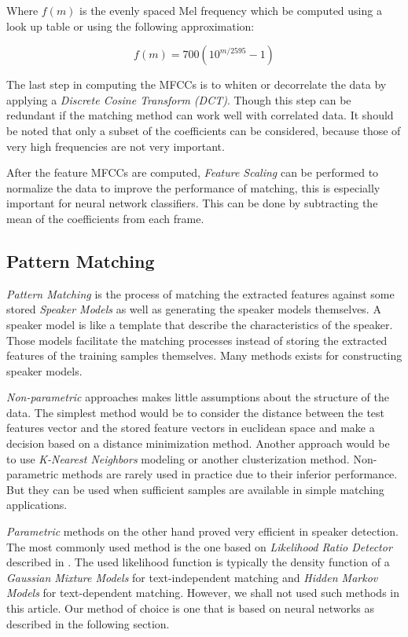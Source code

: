 \documentclass[twocolumn]{article}
\begin{document}
Where $f(m)$ is the evenly spaced Mel frequency which be computed using a look
up table or using the following approximation:

\begin{equation}
f(m) = 700(10^{m / 2595} - 1)
\end{equation}

The last step in computing the MFCCs is to whiten or decorrelate the data by
applying a \emph{Discrete Cosine Transform (DCT)}. Though this step can be
redundant if the matching method can work well with correlated data. It should
be noted that only a subset of the coefficients can be considered, because
those of very high frequencies are not very important.

After the feature MFCCs are computed, \emph{Feature Scaling} can be performed
to normalize the data to improve the performance of matching, this is
especially important for neural network classifiers. This can be done by
subtracting the mean of the coefficients from each frame.

\subsection{Pattern Matching}

\emph{Pattern Matching} is the process of matching the extracted features
against some stored \emph{Speaker Models} as well as generating the speaker
models themselves. A speaker model is like a template that describe the
characteristics of the speaker. Those models facilitate the matching processes
instead of storing the extracted features of the training samples themselves.
Many methods exists for constructing speaker models.

\emph{Non-parametric} approaches makes little assumptions about the structure
of the data. The simplest method would be to consider the distance between the
test features vector and the stored feature vectors in euclidean space and make
a decision based on a distance minimization method. Another approach would be
to use \emph{K-Nearest Neighbors} modeling or another clusterization method.
Non-parametric methods are rarely used in practice due to their inferior
performance. But they can be used when sufficient samples are available in
simple matching applications.

\emph{Parametric} methods on the other hand proved very efficient in speaker
detection. The most commonly used method is the one based on \emph{Likelihood
Ratio Detector} described in \autocite{Dunn2000}. The used likelihood function
is typically the density function of a \emph{Gaussian Mixture Models} for
text-independent matching and \emph{Hidden Markov Models} for text-dependent
matching. However, we shall not used such methods in this article. Our method
of choice is one that is based on neural networks as described in the following
section.
\end{document}
